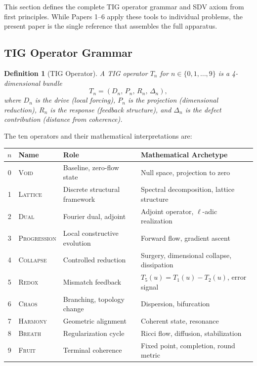 \documentclass[11pt]{article}
\newtheorem{definition}[theorem]{Definition}
\begin{document}
This section defines the complete TIG operator grammar and SDV axiom
from first principles.  While Papers 1--6 apply these tools to
individual problems, the present paper is the single reference that
assembles the full apparatus.

\subsection{TIG Operator Grammar}
\label{subsec:tig}

\begin{definition}[TIG Operator]
\label{def:tig-op}
A \emph{TIG operator} $T_n$ for $n \in \{0,1,\ldots,9\}$ is a
4-dimensional bundle
\[
T_n = (D_n,\, P_n,\, R_n,\, \Delta_n),
\]
where $D_n$ is the \emph{drive} (local forcing), $P_n$ is the
\emph{projection} (dimensional reduction), $R_n$ is the \emph{response}
(feedback structure), and $\Delta_n$ is the \emph{defect contribution}
(distance from coherence).
\end{definition}

\noindent
The ten operators and their mathematical interpretations are:

\begin{center}
\begin{tabular}{@{}clll@{}}
\toprule
$n$ & Name & Role & Mathematical Archetype \\
\midrule
0 & \textsc{Void} & Baseline, zero-flow state & Null space, projection to zero \\
1 & \textsc{Lattice} & Discrete structural framework & Spectral decomposition, lattice structure \\
2 & \textsc{Dual} & Fourier dual, adjoint & Adjoint operator, $\ell$-adic realization \\
3 & \textsc{Progression} & Local constructive evolution & Forward flow, gradient ascent \\
4 & \textsc{Collapse} & Controlled reduction & Surgery, dimensional collapse, dissipation \\
5 & \textsc{Redox} & Mismatch feedback & $T_5(u) = T_1(u) - T_2(u)$, error signal \\
6 & \textsc{Chaos} & Branching, topology change & Dispersion, bifurcation \\
7 & \textsc{Harmony} & Geometric alignment & Coherent state, resonance \\
8 & \textsc{Breath} & Regularization cycle & Ricci flow, diffusion, stabilization \\
9 & \textsc{Fruit} & Terminal coherence & Fixed point, completion, round metric \\
\bottomrule
\end{tabular}
\end{center}
\end{document}
